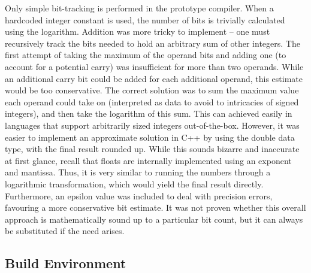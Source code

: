 \documentclass[12pt,a4paper,twoside]{report}
\begin{document}
Only simple bit-tracking is performed in the prototype compiler. When a hardcoded integer constant is used, the number of bits is trivially calculated using the logarithm. Addition was more tricky to implement -- one must recursively track the bits needed to hold an arbitrary sum of other integers. The first attempt of taking the maximum of the operand bits and adding one (to account for a potential carry) was insufficient for more than two operands. While an additional carry bit could be added for each additional operand, this estimate would be too conservative. The correct solution was to sum the maximum value each operand could take on (interpreted as data to avoid to intricacies of signed integers), and then take the logarithm of this sum. This can achieved easily in languages that support arbitrarily sized integers out-of-the-box. However, it was easier to implement an approximate solution in C++ by using the double data type, with the final result rounded up. While this sounds bizarre and inaccurate at first glance, recall that floats are internally implemented using an exponent and mantissa. Thus, it is very similar to running the numbers through a logarithmic transformation, which would yield the final result directly. Furthermore, an epsilon value was included to deal with precision errors, favouring a more conservative bit estimate. It was not proven whether this overall approach is mathematically sound up to a particular bit count, but it can always be substituted if the need arises.

\subsection{Build Environment}
\end{document}
